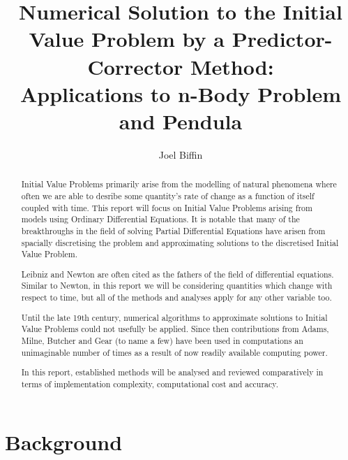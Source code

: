 \documentclass[12pt, twoside]{report}
\theoremstyle{plain}
\theoremstyle{definition}
\theoremstyle{definition}
\begin{document}

\title{
    \large{Numerical Solution to the Initial Value Problem by a 
    Predictor-Corrector Method:}\\
    Applications to n-Body Problem and Pendula}
\author{Joel Biffin}
\maketitle


\tableofcontents


\begin{abstract}

    Initial Value Problems primarily arise from the modelling of natural
    phenomena where often we are able to desribe some quantity's rate of change
    as a function of itself coupled with time. This report will focus on
    Initial Value Problems arising from models using Ordinary Differential
    Equations. It is notable that many of the breakthroughs in the field of
    solving Partial Differential Equations have arisen from spacially
    discretising the problem and approximating solutions to the discretised
    Initial Value Problem.

    Leibniz and Newton are often cited as the fathers of the field of
    differential equations. Similar to Newton, in this report we will be
    considering quantities which change with respect to time, but all of the
    methods and analyses apply for any other variable too. 

    Until the late 19th century, numerical algorithms to approximate solutions
    to Initial Value Problems could not usefully be applied. Since then
    contributions from Adams, Milne, Butcher and Gear (to name a few) have been
    used in computations an unimaginable number of times as a result of now 
    readily available computing power. 

    In this report, established methods will be analysed and reviewed 
    comparatively in terms of implementation complexity, computational cost
    and accuracy.

\end{abstract}



\chapter{Background}
    
\end{document}
